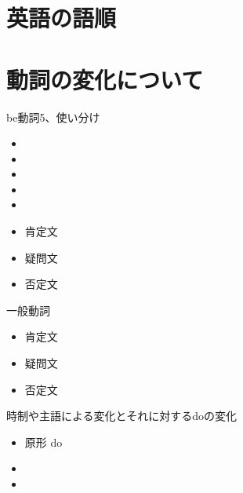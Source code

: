 \documentclass[10pt]{jsarticle}
\newcommand{\answer}[2]{{\color{orange}#2}}
\newcommand{\answer}[2]{\vspace{#1mm}}
\begin{document}
\section{英語の語順}
\begin{screen}
  \vspace{1cm}
\end{screen}

\section{動詞の変化について}
\begin{itembox}[l]{be動詞5、使い分け}
  \begin{multicols}{5}
    \begin{itemize}
      \item  \item \item \item \item
    \end{itemize}
  \end{multicols}
  \vspace{3mm}
  \begin{itemize}
    \item 肯定文 \answer{5}{}
    \item 疑問文 \answer{5}{}
    \item 否定文 \answer{5}{}
  \end{itemize}
\end{itembox}

\begin{itembox}[l]{一般動詞}

  \begin{itemize}
    \item 肯定文 \answer{5}{}
    \item 疑問文 \answer{5}{}
    \item 否定文 \answer{5}{}
  \end{itemize}
  時制や主語による変化とそれに対するdoの変化
  \begin{multicols}{3}
    \begin{itemize}
      \item 原形 do
      \item \answer{5}{}
      \item \answer{5}{}
    \end{itemize}
  \end{multicols}
\end{itembox}
\end{document}
